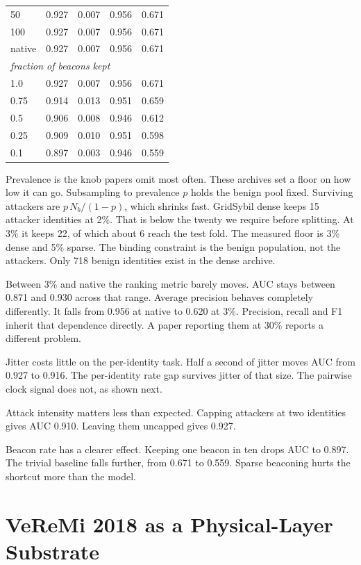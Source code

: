 \documentclass[conference]{IEEEtran}
\begin{document}
\begin{table}[t]
\begin{tabular}{lrrrr}
50 & 0.927 & 0.007 & 0.956 & 0.671 \\
100 & 0.927 & 0.007 & 0.956 & 0.671 \\
native & 0.927 & 0.007 & 0.956 & 0.671 \\
\midrule
\multicolumn{5}{l}{\emph{fraction of beacons kept}} \\
1.0 & 0.927 & 0.007 & 0.956 & 0.671 \\
0.75 & 0.914 & 0.013 & 0.951 & 0.659 \\
0.5 & 0.906 & 0.008 & 0.946 & 0.612 \\
0.25 & 0.909 & 0.010 & 0.951 & 0.598 \\
0.1 & 0.897 & 0.003 & 0.946 & 0.559 \\
\bottomrule
\end{tabular}
\end{table}

Prevalence is the knob papers omit most often.
These archives set a floor on how low it can go.
Subsampling to prevalence $p$ holds the benign pool fixed.
Surviving attackers are $p\,N_{b}/(1-p)$, which shrinks fast.
GridSybil dense keeps 15 attacker identities at 2\%.
That is below the twenty we require before splitting.
At 3\% it keeps 22, of which about 6 reach the test fold.
The measured floor is 3\% dense and 5\% sparse.
The binding constraint is the benign population, not the attackers.
Only 718 benign identities exist in the dense archive.

Between 3\% and native the ranking metric barely moves.
AUC stays between 0.871 and 0.930 across that range.
Average precision behaves completely differently.
It falls from 0.956 at native to 0.620 at 3\%.
Precision, recall and F1 inherit that dependence directly.
A paper reporting them at 30\% reports a different problem.

Jitter costs little on the per-identity task.
Half a second of jitter moves AUC from 0.927 to 0.916.
The per-identity rate gap survives jitter of that size.
The pairwise clock signal does not, as shown next.

Attack intensity matters less than expected.
Capping attackers at two identities gives AUC 0.910.
Leaving them uncapped gives 0.927.

Beacon rate has a clearer effect.
Keeping one beacon in ten drops AUC to 0.897.
The trivial baseline falls further, from 0.671 to 0.559.
Sparse beaconing hurts the shortcut more than the model.

\section{VeReMi 2018 as a Physical-Layer Substrate}
\end{document}
